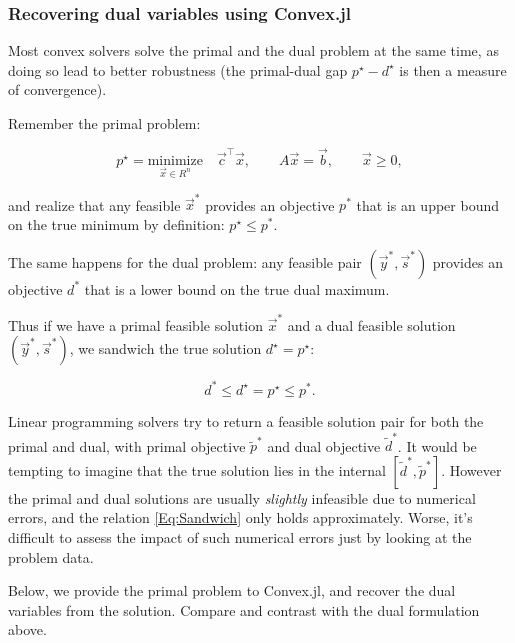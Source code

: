 \documentclass[11pt]{article}
\begin{document}
    \subsubsection{Recovering dual variables using
Convex.jl}\label{recovering-dual-variables-using-convex.jl}

Most convex solvers solve the primal and the dual problem at the same
time, as doing so lead to better robustness (the primal-dual gap
\(p^\star - d^\star\) is then a measure of convergence).

Remember the primal problem:

\begin{equation*}
  p^\star = \underset{\vec{x} \in R^n }{\text{minimize}} \quad \vec{c}^\top \vec{x}, \qquad A \vec{x} = \vec{b}, \qquad \vec{x} \ge 0,
\end{equation*}

and realize that any feasible \(\vec{x}^*\) provides an objective
\(p^*\) that is an upper bound on the true minimum by definition:
\(p^\star \le p^*\).

The same happens for the dual problem: any feasible pair
\((\vec{y}^*, \vec{s}^*)\) provides an objective \(d^*\) that is a lower
bound on the true dual maximum.

Thus if we have a primal feasible solution \(\vec{x}^*\) and a dual
feasible solution \((\vec{y}^*, \vec{s}^*)\), we sandwich the true
solution \(d^\star = p^\star\):

\begin{equation}
\label{Eq:Sandwich}
d^* \le d^\star = p^\star \le p^*.
\end{equation}

Linear programming solvers try to return a feasible solution pair for
both the primal and dual, with primal objective \(\tilde{p}^*\) and dual
objective \(\tilde{d}^*\). It would be tempting to imagine that the true
solution lies in the internal \([\tilde{d}^*, \tilde{p}^*]\). However
the primal and dual solutions are usually \emph{slightly} infeasible due
to numerical errors, and the relation \eqref{Eq:Sandwich} only holds
approximately. Worse, it's difficult to assess the impact of such
numerical errors just by looking at the problem data.

Below, we provide the primal problem to Convex.jl, and recover the dual
variables from the solution. Compare and contrast with the dual
formulation above.
\end{document}
